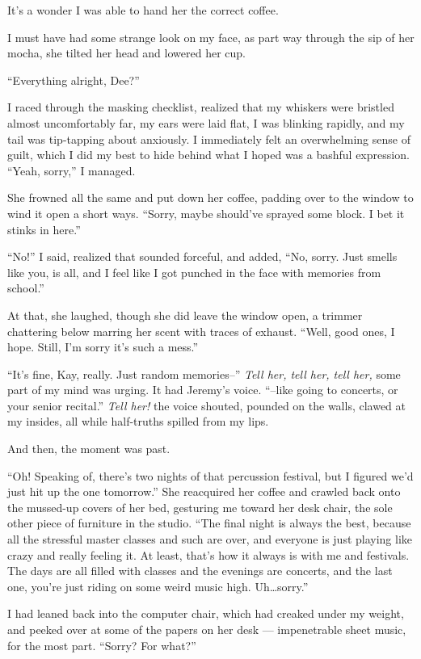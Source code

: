 It's a wonder I was able to hand her the correct coffee.

I must have had some strange look on my face, as part way through the sip of her mocha, she tilted her head and lowered her cup.

``Everything alright, Dee?''

I raced through the masking checklist, realized that my whiskers were bristled almost uncomfortably far, my ears were laid flat, I was blinking rapidly, and my tail was tip-tapping about anxiously. I immediately felt an overwhelming sense of guilt, which I did my best to hide behind what I hoped was a bashful expression. ``Yeah, sorry,'' I managed.

She frowned all the same and put down her coffee, padding over to the window to wind it open a short ways. ``Sorry, maybe should've sprayed some block. I bet it stinks in here.''

``No!'' I said, realized that sounded forceful, and added, ``No, sorry. Just smells like you, is all, and I feel like I got punched in the face with memories from school.''

At that, she laughed, though she did leave the window open, a trimmer chattering below marring her scent with traces of exhaust. ``Well, good ones, I hope. Still, I'm sorry it's such a mess.''

``It's fine, Kay, really. Just random memories--'' \emph{Tell her, tell her, tell her,} some part of my mind was urging. It had Jeremy's voice. ``--like going to concerts, or your senior recital.'' \emph{Tell her!} the voice shouted, pounded on the walls, clawed at my insides, all while half-truths spilled from my lips.

And then, the moment was past.

``Oh! Speaking of, there's two nights of that percussion festival, but I figured we'd just hit up the one tomorrow.'' She reacquired her coffee and crawled back onto the mussed-up covers of her bed, gesturing me toward her desk chair, the sole other piece of furniture in the studio. ``The final night is always the best, because all the stressful master classes and such are over, and everyone is just playing like crazy and really feeling it. At least, that's how it always is with me and festivals. The days are all filled with classes and the evenings are concerts, and the last one, you're just riding on some weird music high. Uh\ldots sorry.''

I had leaned back into the computer chair, which had creaked under my weight, and peeked over at some of the papers on her desk --- impenetrable sheet music, for the most part. ``Sorry? For what?''


